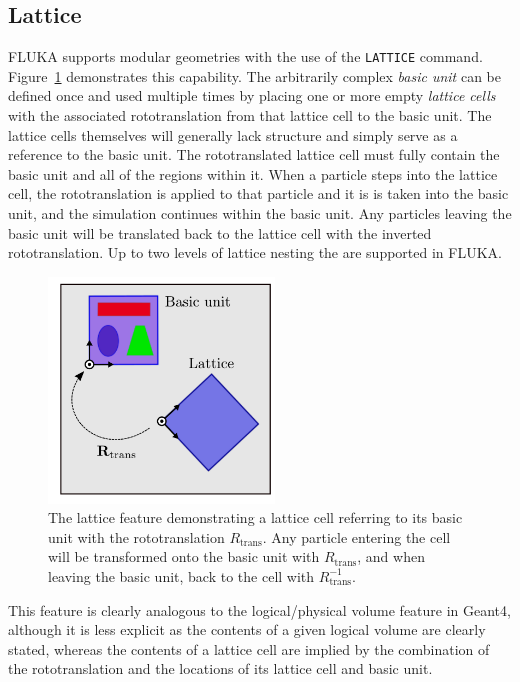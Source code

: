 \documentclass[final,5p,times,twocolumn]{elsarticle}
\newcommand{\fluka}[1]{\texttt{\MakeUppercase{#1}}}
\begin{document}
\subsection{Lattice}

FLUKA supports modular geometries with the use of the \fluka{lattice}
command. Figure~\ref{fig:lattice} demonstrates this capability. The
arbitrarily complex \emph{basic unit} can be defined once and used
multiple times by placing one or more empty \emph{lattice cells} with the
associated rototranslation from that lattice cell to the basic
unit. The lattice cells themselves will generally lack structure
and simply serve as a reference to the basic unit. The rototranslated
lattice cell must fully contain the basic unit and all of the regions
within it. When a particle steps into the lattice cell, the
rototranslation is applied to that particle and it is is taken into the
basic unit, and the simulation continues within the basic unit. Any
particles leaving the basic unit will be translated back to the
lattice cell with the inverted rototranslation. Up to two
levels of lattice nesting the are supported in FLUKA.

\begin{figure}[hbtp]
\begin{center}
\includegraphics[width=6cm]{./diagrams/lattice}
\caption{The lattice feature demonstrating a lattice cell
  referring to its basic unit with the rototranslation $R_\textrm{trans}$.
  Any particle entering the cell will be transformed onto the basic unit
  with $R_\textrm{trans}$, and when leaving the basic unit, back to the cell
  with $R_\textrm{trans}^{-1}$.}
\label{fig:lattice}
\end{center}
\end{figure}
This feature is clearly analogous to the logical/physical volume feature in
Geant4, although it is less explicit as the contents of a given logical
volume are clearly stated, whereas the contents of a lattice cell
are implied by the combination of the rototranslation and the locations of
its lattice cell and basic unit.
\end{document}
